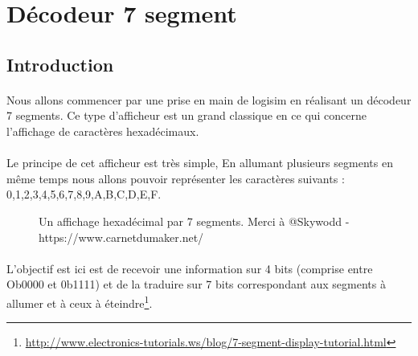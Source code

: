 \section{Décodeur 7 segment}
\subsection{Introduction}
\paragraph{}
Nous allons commencer par une prise en main de logisim en réalisant un décodeur 7 segments. Ce type d'afficheur est un grand classique en ce qui concerne l'affichage de caractères hexadécimaux.

\paragraph{}
Le principe de cet afficheur est très simple, En allumant plusieurs segments en même temps nous allons pouvoir représenter les caractères suivants :
0,1,2,3,4,5,6,7,8,9,A,B,C,D,E,F.

\begin{figure}[H]
	\caption{Un affichage hexadécimal par 7 segments. Merci à @Skywodd - https://www.carnetdumaker.net/}
\end{figure}

\paragraph{}
L'objectif est ici est de recevoir une information sur 4 bits (comprise entre Ob0000 et 0b1111) et de la traduire sur 7 bits correspondant aux segments à allumer et à ceux à éteindre\footnote{\url{http://www.electronics-tutorials.ws/blog/7-segment-display-tutorial.html}}.

